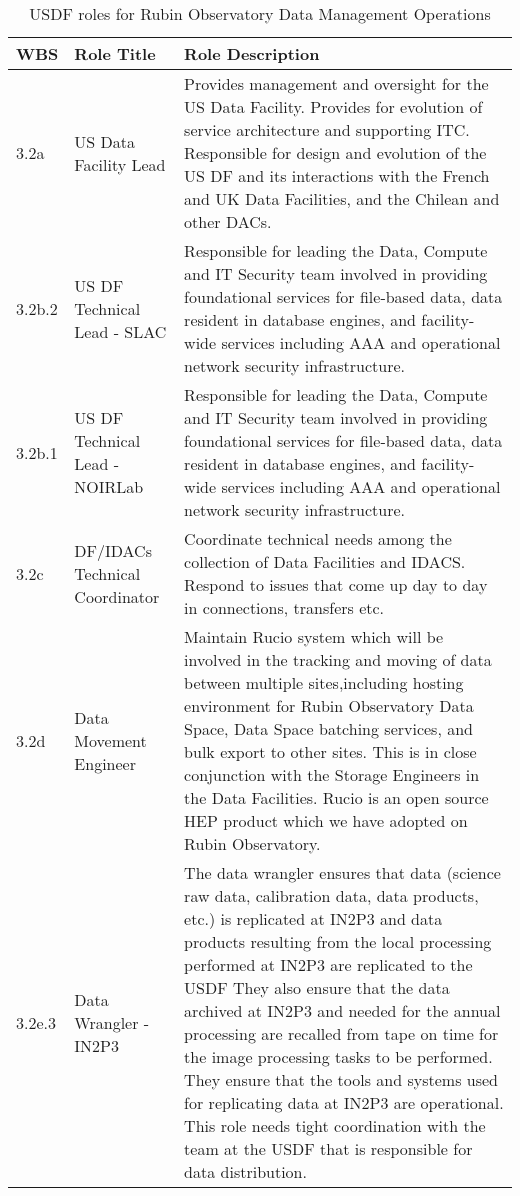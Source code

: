 \normalsize \begin{longtable} {|p{}|p{}|p{}|} \caption{USDF roles for Rubin Observatory Data Management Operations \label{tab:usdfroles}}\\ 
\hline 
\textbf{WBS}&\textbf{Role Title}&\textbf{Role Description} \\ \hline
{3.2a}&{US Data Facility Lead}&{Provides management and oversight for the US Data Facility. Provides for evolution of service architecture and supporting ITC. Responsible for design and evolution of the US DF and its interactions with the French and UK Data Facilities, and the Chilean and other DACs.} \\ \hline
{3.2b.2}&{US DF Technical Lead - SLAC}&{Responsible for leading the Data, Compute and IT Security team involved in providing foundational services for file-based data, data resident in database engines, and facility-wide services including AAA and operational network security infrastructure.} \\ \hline
{3.2b.1}&{US DF Technical Lead - NOIRLab}&{Responsible for leading the Data, Compute and IT Security team involved in providing foundational services for file-based data, data resident in database engines, and facility-wide services including AAA and operational network security infrastructure.} \\ \hline
{3.2c}&{DF/IDACs Technical Coordinator}&{Coordinate technical needs among the collection of Data Facilities and IDACS. Respond to issues that come up day to day in connections, transfers etc.} \\ \hline
{3.2d}&{Data Movement Engineer}&{Maintain Rucio system which will be involved in the tracking and moving of data between multiple sites,including hosting environment for Rubin Observatory Data Space, Data Space batching services, and bulk export to other sites. This is in close conjunction with the Storage Engineers in the Data Facilities. Rucio is an open source HEP product which we have adopted on Rubin Observatory.} \\ \hline
{3.2e.3}&{Data Wrangler - IN2P3}&{The data wrangler ensures that data (science raw data, calibration data, data products, etc.) is replicated at IN2P3 and data products resulting from the local processing performed at IN2P3 are replicated to the USDF They also ensure that the data archived at IN2P3 and needed for the annual processing are recalled from tape on time for the image processing tasks to be performed. They ensure that the tools and systems used for replicating data at IN2P3 are operational. This role needs tight coordination with the team at the USDF that is responsible for data distribution.} \\ \hline

\end{longtable}
